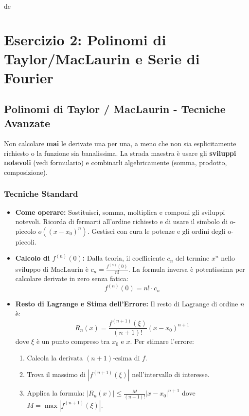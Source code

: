 de\section{Esercizio 2: Polinomi di Taylor/MacLaurin e Serie di Fourier}

\subsection{Polinomi di Taylor / MacLaurin - Tecniche Avanzate}
\begin{strategia}
Non calcolare \textbf{mai} le derivate una per una, a meno che non sia esplicitamente richiesto o la funzione sia banalissima. La strada maestra è usare gli \textbf{sviluppi notevoli} (vedi formulario) e combinarli algebricamente (somma, prodotto, composizione).
\end{strategia}

\subsubsection{Tecniche Standard}
\begin{itemize}
    \item \textbf{Come operare:} Sostituisci, somma, moltiplica e componi gli sviluppi notevoli. Ricorda di fermarti all'ordine richiesto e di usare il simbolo di o-piccolo \(o((x-x_0)^n)\). Gestisci con cura le potenze e gli ordini degli o-piccoli.
    \item \textbf{Calcolo di \(f^{(n)}(0)\):} Dalla teoria, il coefficiente \(c_n\) del termine \(x^n\) nello sviluppo di MacLaurin è \(c_n = \frac{f^{(n)}(0)}{n!}\). La formula inversa è potentissima per calcolare derivate in zero senza fatica: 
    \[ f^{(n)}(0) = n! \cdot c_n \]
    \item \textbf{Resto di Lagrange e Stima dell'Errore:} Il resto di Lagrange di ordine \(n\) è:
    \[ R_n(x) = \frac{f^{(n+1)}(\xi)}{(n+1)!}(x-x_0)^{n+1} \]
    dove \(\xi\) è un punto compreso tra \(x_0\) e \(x\). Per stimare l'errore:
    \begin{enumerate}
        \item Calcola la derivata \((n+1)\)-esima di \(f\).
        \item Trova il massimo di \(|f^{(n+1)}(\xi)|\) nell'intervallo di interesse.
        \item Applica la formula: \(|R_n(x)| \le \frac{M}{(n+1)!}|x-x_0|^{n+1}\) dove \(M = \max |f^{(n+1)}(\xi)|\).
    \end{enumerate}
\end{itemize}

